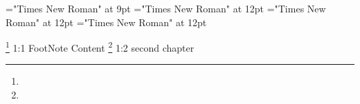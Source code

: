 \font\footnotepsectionscriptureTextscrBody="Times New Roman" at 9pt
\font\psectionscriptureTextscrBody="Times New Roman" at 12pt
\font\sectionscriptureTextscrBody="Times New Roman" at 12pt
\font\scriptureTextscrBody="Times New Roman" at 12pt

  \footnote {} {1:1 FootNote Content}  \footnote {} {1:2 second chapter
                  }

\bye
